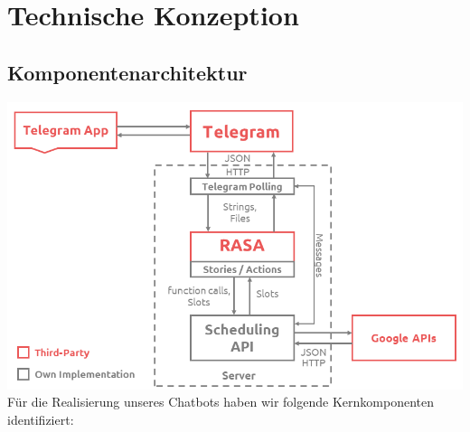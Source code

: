 \chapter{Technische Konzeption}

\section{Komponentenarchitektur}
\includegraphics[width=\linewidth]{components}
\\

Für die Realisierung unseres Chatbots haben wir folgende Kernkomponenten identifiziert:

